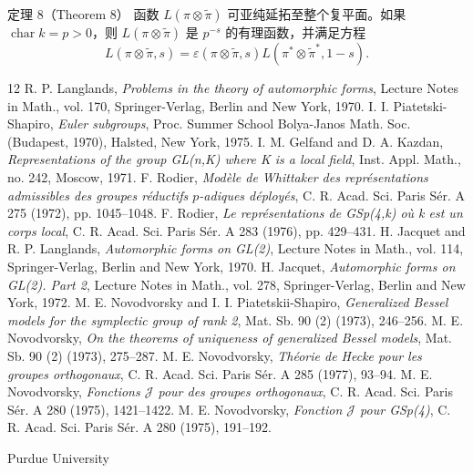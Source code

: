 \begin{originaltheorem}{定理 8（Theorem 8）}
函数 $L(\pi\otimes\widetilde\pi)$ 可亚纯延拓至整个复平面。如果 $\operatorname{char}k=p>0$，则 $L(\pi\otimes\widetilde\pi)$ 是 $p^{-s}$ 的有理函数，并满足方程
\begin{equation}
 L(\pi\otimes\widetilde\pi,s)=\varepsilon(\pi\otimes\widetilde\pi,s)
 L(\pi^*\otimes\widetilde\pi^*,1-s).
 \tag{3.12}
\end{equation}
\end{originaltheorem}

\begin{thebibliography}{12}
 R. P. Langlands, \emph{Problems in the theory of automorphic forms}, Lecture Notes in Math., vol. 170, Springer-Verlag, Berlin and New York, 1970.
 I. I. Piatetski-Shapiro, \emph{Euler subgroups}, Proc. Summer School Bolya-Janos Math. Soc. (Budapest, 1970), Halsted, New York, 1975.
 I. M. Gelfand and D. A. Kazdan, \emph{Representations of the group GL(n,K) where K is a local field}, Inst. Appl. Math., no. 242, Moscow, 1971.
 F. Rodier, \emph{Modèle de Whittaker des représentations admissibles des groupes réductifs $p$-adiques déployés}, C. R. Acad. Sci. Paris Sér. A 275 (1972), pp. 1045--1048.
 F. Rodier, \emph{Le représentations de GSp(4,k) où k est un corps local}, C. R. Acad. Sci. Paris Sér. A 283 (1976), pp. 429--431.
 H. Jacquet and R. P. Langlands, \emph{Automorphic forms on GL(2)}, Lecture Notes in Math., vol. 114, Springer-Verlag, Berlin and New York, 1970.
 H. Jacquet, \emph{Automorphic forms on GL(2). Part 2}, Lecture Notes in Math., vol. 278, Springer-Verlag, Berlin and New York, 1972.
 M. E. Novodvorsky and I. I. Piatetskii-Shapiro, \emph{Generalized Bessel models for the symplectic group of rank 2}, Mat. Sb. 90 (2) (1973), 246--256.
 M. E. Novodvorsky, \emph{On the theorems of uniqueness of generalized Bessel models}, Mat. Sb. 90 (2) (1973), 275--287.
 M. E. Novodvorsky, \emph{Théorie de Hecke pour les groupes orthogonaux}, C. R. Acad. Sci. Paris Sér. A 285 (1977), 93--94.
 M. E. Novodvorsky, \emph{Fonctions $\mathcal J$ pour des groupes orthogonaux}, C. R. Acad. Sci. Paris Sér. A 280 (1975), 1421--1422.
 M. E. Novodvorsky, \emph{Fonction $\mathcal J$ pour GSp(4)}, C. R. Acad. Sci. Paris Sér. A 280 (1975), 191--192.
\end{thebibliography}
\begin{flushleft}\small Purdue University\end{flushleft}
